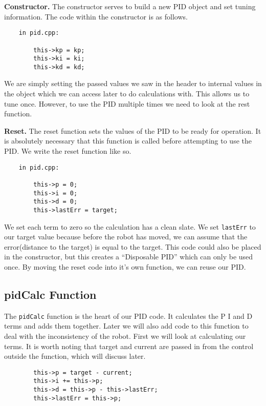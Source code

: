 \documentclass[12pt]{article}
\begin{document}
    \textbf{Constructor.} The constructor serves to build a new PID object and set tuning information. The code within the constructor is as follows.

    \begin{verbatim}
    in pid.cpp:

        this->kp = kp;
        this->ki = ki;
        this->kd = kd;
    \end{verbatim}

    We are simply setting the passed values we saw in the header to internal values in the object which we can access later to do calculations with. This allows us to tune once. However, to use the PID multiple times we need to look at the rest function.

    \textbf{Reset.} The reset function sets the values of the PID to be ready for operation. It is absolutely necessary that this function is called before attempting to use the PID. We write the reset function like so.

    \begin{verbatim}
    in pid.cpp:

        this->p = 0;
        this->i = 0;
        this->d = 0;
        this->lastErr = target;
    \end{verbatim}

    We set each term to zero so the calculation has a clean slate. We set \verb|lastErr| to our target value because before the robot has moved, we can assume that the error(distance to the target) is equal to the target. This code could also be placed in the constructor, but this creates a ``Disposable PID'' which can only be used once. By moving the reset code into it's own function, we can reuse our PID.

\subsection{pidCalc Function}

    The \verb|pidCalc| function is the heart of our PID code. It calculates the P I and D terms and adds them together. Later we will also add code to this function to deal with the inconsistency of the robot. First we will look at calculating our terms. It is worth noting that target and current are passed in from the control outside the function, which will discuss later.
    \begin{verbatim}
        this->p = target - current;
        this->i += this->p;
        this->d = this->p - this->lastErr;
        this->lastErr = this->p;
    \end{verbatim}
\end{document}
